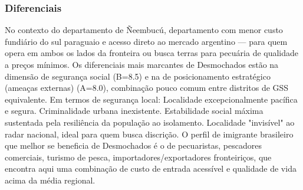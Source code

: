 \subsubsection*{Diferenciais}\label{dif-desmochados-1204}
No contexto do departamento de Ñeembucú, departamento com menor custo fundiário do sul paraguaio e acesso direto ao mercado argentino — para quem opera em ambos os lados da fronteira ou busca terras para pecuária de qualidade a preços mínimos. Os diferenciais mais marcantes de Desmochados estão na dimensão de segurança social (B=8.5) e na de posicionamento estratégico (ameaças externas) (A=8.0), combinação pouco comum entre distritos de GSS equivalente. Em termos de segurança local: Localidade excepcionalmente pacífica e segura. Criminalidade urbana inexistente. Estabilidade social máxima sustentada pela resiliência da população ao isolamento. Localidade "invisível" ao radar nacional, ideal para quem busca discrição. O perfil de imigrante brasileiro que melhor se beneficia de Desmochados é o de pecuaristas, pescadores comerciais, turismo de pesca, importadores/exportadores fronteiriços, que encontra aqui uma combinação de custo de entrada acessível e qualidade de vida acima da média regional.
